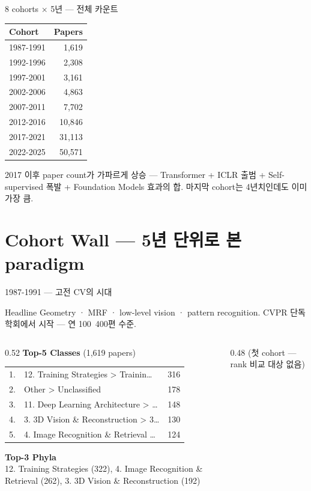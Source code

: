 \documentclass[aspectratio=169,t]{beamer}
\newcommand{\muted}[1]{\textcolor{mutedgray}{#1}}
\begin{document}
\begin{frame}{8 cohorts × 5년 — 전체 카운트}
\centering
\begin{tabular}{@{}lr@{}}
\toprule
\textbf{Cohort} & \textbf{Papers} \\
\midrule
  1987-1991 & 1,619 \\
  1992-1996 & 2,308 \\
  1997-2001 & 3,161 \\
  2002-2006 & 4,863 \\
  2007-2011 & 7,702 \\
  2012-2016 & 10,846 \\
  2017-2021 & 31,113 \\
  2022-2025 & 50,571 \\
\bottomrule
\end{tabular}
\vfill
\muted{2017 이후 paper count가 가파르게 상승 — Transformer + ICLR 출범 + Self-supervised 폭발 + Foundation Models 효과의 합. 마지막 cohort는 4년치인데도 이미 가장 큼.}
\end{frame}

\section{Cohort Wall — 5년 단위로 본 paradigm}


\begin{frame}{1987-1991 \quad — \quad 고전 CV의 시대}
\small
\begin{block}{Headline}
Geometry · MRF · low-level vision · pattern recognition. CVPR 단독 학회에서 시작 — 연 100~400편 수준.
\end{block}
\vspace{4pt}

\begin{columns}[T,onlytextwidth]
\begin{column}{0.52\textwidth}
\textbf{Top-5 Classes} \muted{\scriptsize (1,619 papers)}\\[2pt]
\scriptsize
\begin{tabular}{@{}rlr@{}}
    1. & 12. Training Strategies > Trainin… & 316 \\
    2. & Other > Unclassified & 178 \\
    3. & 11. Deep Learning Architecture > … & 148 \\
    4. & 3. 3D Vision \& Reconstruction > 3… & 130 \\
    5. & 4. Image Recognition \& Retrieval … & 124 \\
\end{tabular}
\vspace{8pt}

\textbf{\small Top-3 Phyla}\\[2pt]
\scriptsize 12. Training Strategies (322), 4. Image Recognition \& Retrieval (262), 3. 3D Vision \& Reconstruction (192)
\end{column}

\begin{column}{0.48\textwidth}
\muted{\small (첫 cohort — rank 비교 대상 없음)}
\end{column}
\end{columns}
\end{frame}
\end{document}
